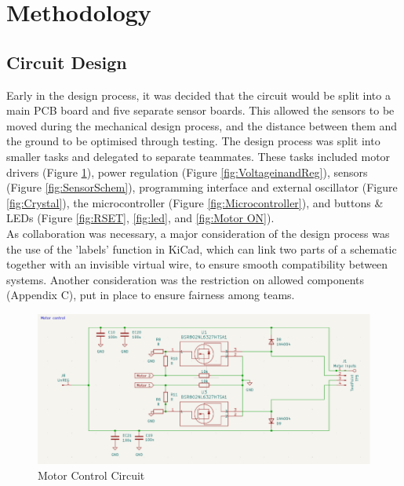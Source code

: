 \section{Methodology}
\subsection{Circuit Design}
Early in the design process, it was decided that the circuit would be split into a main PCB board and five separate sensor boards. This allowed the sensors to be moved during the mechanical design process, and the distance between them and the ground to be optimised through testing. The design process was split into smaller tasks and delegated to separate teammates. These tasks included motor drivers (Figure \ref{fig:MotorControlCircuit}), power regulation (Figure \ref{fig:VoltageinandReg}), sensors (Figure \ref{fig:SensorSchem}), programming interface and external oscillator (Figure \ref{fig:Crystal}), the microcontroller (Figure \ref{fig:Microcontroller}), and buttons \& LEDs (Figure \ref{fig:RSET}, \ref{fig:led}, and \ref{fig:Motor ON}).
\\

As collaboration was necessary, a major consideration of the design process was the use of the 'labels' function in KiCad, which can link two parts of a schematic together with an invisible virtual wire, to ensure smooth compatibility between systems. Another consideration was the restriction on allowed components (Appendix C), put in place to ensure fairness among teams.


\begin{figure}[H]
    \centering
    \includegraphics[width=0.8\linewidth]{REPORT/MotorControlCircuit.png}
    \caption{Motor Control Circuit}
    \label{fig:MotorControlCircuit}
\end{figure}

